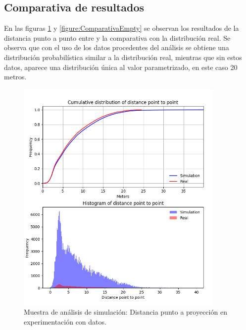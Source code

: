 \subsection{Comparativa de resultados}
En las figuras \ref{figure:ComparativaReal} y \ref{figure:ComparativaEmpty} se observan los resultados de la distancia punto a punto entre y la comparativa con la distribución real. Se observa que con el uso de los datos 
procedentes del análisis se obtiene una distribución probabilística similar a la distribución real, mientras que 
sin estos datos, aparece una distribución única al valor parametrizado, en este caso 20 metros.

\begin{figure}[!htb]
\begin{minipage}{0.48\textwidth}
\centering
\includegraphics[width=0.9\textwidth]{./Imagenes/SimulationComparative.png}
\caption{Muestra de análisis de simulación: Distancia punto a proyección en experimentación con datos.}
\label{figure:ComparativaReal}
\end{minipage}\hfill
\begin{minipage}{0.48\textwidth}
\centering

\end{minipage}
\end{figure}
